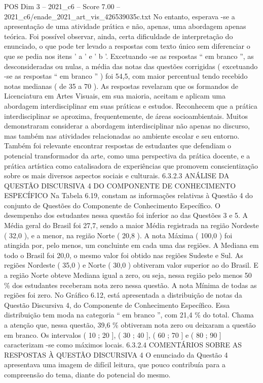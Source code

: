 \begin{textsample}{POS Dim 3 – 2021\_c6 – Score 7.00 – 2021\_c6/enade\_2021\_art\_vis\_426539035c.txt}
No entanto, esperava -se a apresentação de uma atividade prática e não, apenas, uma abordagem apenas teórica.
Foi possível observar, ainda, certa dificuldade de interpretação do enunciado, o que pode ter levado a respostas com texto único sem diferenciar o que se pedia nos itens ' a ' e ' b '.
Excetuando -se as respostas “ em branco ”, as desconsideradas ou nulas, a média das notas das questões corrigidas ( excetuando -se as respostas “ em branco ” ) foi 54,5, com maior percentual tendo recebido notas medianas ( de 35 a 70 ).
As respostas revelaram que os formandos de Licenciatura em Artes Visuais, em sua maioria, aceitam e aplicam uma abordagem interdisciplinar em suas práticas e estudos.
Reconhecem que a prática interdisciplinar se aproxima, frequentemente, de áreas socioambientais.
Muitos demonstraram considerar a abordagem interdisciplinar não apenas no discurso, mas também nas atividades relacionadas ao ambiente escolar e seu entorno.
Também foi relevante encontrar respostas de estudantes que defendiam o potencial transformador da arte, como uma perspectiva da prática docente, e a prática artística como catalisadora de experiências que promovem conscientização sobre os mais diversos aspectos sociais e culturais. 6.3.2.3 ANÁLISE DA QUESTÃO DISCURSIVA 4 DO COMPONENTE DE CONHECIMENTO ESPECÍFICO Na Tabela 6.19, constam as informações relativas à Questão 4 do conjunto de Questões do Componente de Conhecimento Específico.
O desempenho dos estudantes nessa questão foi inferior ao das Questões 3 e 5.
A Média geral do Brasil foi 27,7, sendo a maior Média registrada na região Nordeste ( 32,0 ), e a menor, na região Norte ( 20,8 ).
A nota Máxima ( 100,0 ) foi atingida por, pelo menos, um concluinte em cada uma das regiões.
A Mediana em todo o Brasil foi 20,0, o mesmo valor foi obtido nas regiões Sudeste e Sul.
As regiões Nordeste ( 35,0 ) e Norte ( 30,0 ) obtiveram valor superior ao do Brasil.
E a região Norte obteve Mediana igual a zero, ou seja, nessa região pelo menos 50 \% dos estudantes receberam nota zero nessa questão.
A nota Mínima de todas as regiões foi zero.
No Gráfico 6.12, está apresentada a distribuição de notas da Questão Discursiva 4, do Componente de Conhecimento Específico.
Essa distribuição tem moda na categoria “ em branco ”, com 21,4 \% do total.
Chama a atenção que, nessa questão, 39,6 \% obtiveram nota zero ou deixaram a questão em branco.
Os intervalos ( 10 ; 20 ], ( 30 ; 40 ], ( 60 ; 70 ] e ( 80 ; 90 ] caracterizam -se como máximos locais. 6.3.2.4 COMENTÁRIOS SOBRE AS RESPOSTAS À QUESTÃO DISCURSIVA 4 O enunciado da Questão 4 apresentava uma imagem de difícil leitura, que pouco contribuía para a compreensão do tema, diante do potencial do mesmo.

\end{textsample}

